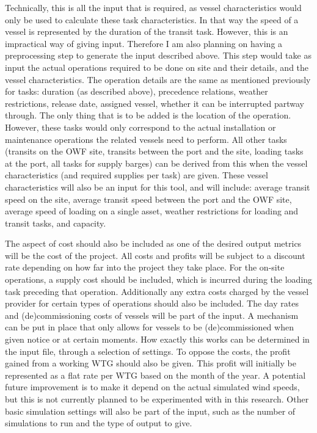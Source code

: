\documentclass[a4paper,12pt]{article}
\begin{document}
Technically, this is all the input that is required, as vessel characteristics would only be used to calculate these task characteristics. In that way the speed of a vessel is represented by the duration of the transit task. However, this is an impractical way of giving input. Therefore I am also planning on having a preprocessing step to generate the input described above. This step would take as input the actual operations required to be done on site and their details, and the vessel characteristics. The operation details are the same as mentioned previously for tasks: duration (as described above), precedence relations, weather restrictions, release date, assigned vessel, whether it can be interrupted partway through. The only thing that is to be added is the location of the operation. However, these tasks would only correspond to the actual installation or maintenance operations the related vessels need to perform. All other tasks (transits on the OWF site, transits between the port and the site, loading tasks at the port, all tasks for supply barges) can be derived from this when the vessel characteristics (and required supplies per task) are given. These vessel characteristics will also be an input for this tool, and will include: average transit speed on the site, average transit speed between the port and the OWF site, average speed of loading on a single asset, weather restrictions for loading and transit tasks, and capacity. 

The aspect of cost should also be included as one of the desired output metrics will be the cost of the project. All costs and profits will be subject to a discount rate depending on how far into the project they take place. For the on-site operations, a supply cost should be included, which is incurred during the loading task preceding that operation. Additionally any extra costs charged by the vessel provider for certain types of operations should also be included. The day rates and (de)commissioning costs of vessels will be part of the input. A mechanism can be put in place that only allows for vessels to be (de)commissioned when given notice or at certain moments. How exactly this works can be determined in the input file, through a selection of settings. To oppose the costs, the profit gained from a working WTG should also be given. This profit will initially be represented as a flat rate per WTG based on the month of the year. A potential future improvement is to make it depend on the actual simulated wind speeds, but this is not currently planned to be experimented with in this research. Other basic simulation settings will also be part of the input, such as the number of simulations to run and the type of output to give.
\end{document}
